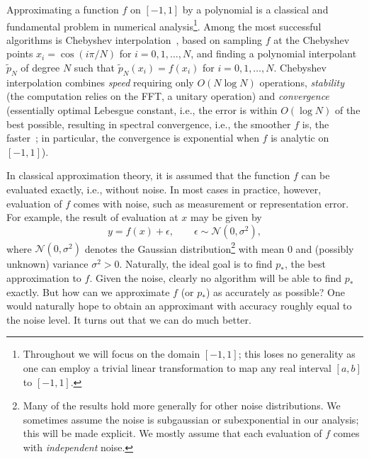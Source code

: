 \documentclass[final,onefignum,onetabnum]{siamart220329}
\begin{document}
Approximating a function $f$ on $[-1,1]$ by a polynomial is a classical and fundamental problem in numerical analysis\footnote{Throughout we will focus on the domain $[-1,1]$; this loses no generality as one can employ a trivial linear transformation to map any real interval $[a,b]$ to $[-1,1]$.}. 
Among the most successful  algorithms is Chebyshev interpolation~\cite[Ch.~2]{trefethenatap}, based on 
sampling $f$ at the Chebyshev points $x_i = \cos(i\pi/N)$ for $i=0,1,\ldots, N$, and finding a polynomial interpolant $\tilde p_N$ of degree $N$ such that $\tilde p_{N}(x_i)=f(x_i)$ for $i=0,1,\ldots, N$. 
Chebyshev interpolation combines \emph{speed} requiring only $O(N\log N)$ operations, \emph{stability} (the computation relies on the FFT, a unitary operation) and \emph{convergence} (essentially optimal Lebesgue constant, i.e., the error is within $O(\log N)$ of the best possible, resulting in spectral convergence, i.e., the smoother $f$ is, the faster~\cite[Ch.~7,8]{trefethenatap}; in particular, the convergence is exponential when $f$ is analytic on $[-1,1]$). 


In classical approximation theory, it is assumed that the function $f$ can be evaluated exactly, i.e., without noise. 
In most cases in practice, however, evaluation of $f$ comes with noise, such as measurement or representation error. 
For example, the result of evaluation at $x$ may be given by 
\begin{equation}\label{eq:eval}
	y = f(x)   + \epsilon,\qquad \epsilon\sim \mathcal{N}(0,\sigma^2), 
\end{equation}
where $\mathcal{N}(0,\sigma^2)$ denotes the Gaussian distribution\footnote{Many of the results hold more generally for other noise distributions. We sometimes assume the noise is subgaussian or subexponential in our analysis; this will be made explicit.
	{We mostly assume that each evaluation of $f$ comes with \emph{independent} noise.}
} with mean 0 and (possibly unknown) variance $\sigma^2>0$.
Naturally, the ideal goal is to find ${p_*}$, the best approximation to $f$. 
Given the noise,  clearly no algorithm will be able to find $p_*$ exactly. But how can we approximate $f$ (or $p_*$) as accurately as possible? 
One would naturally hope to obtain an approximant with accuracy roughly equal to the noise level. It turns out that we can do much better. 
\end{document}
